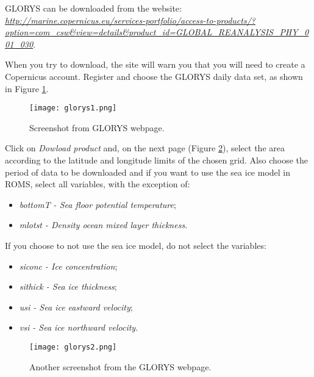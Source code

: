\noindent GLORYS can be downloaded from the website: 
\textcolor{bleu_cite}{\href{http://marine.copernicus.eu/services-portfolio/access-to-products/?option=com\_csw\&view=details\&product\_id=GLOBAL\_REANALYSIS\_PHY\_001\_030}{\textit{http://marine.copernicus.eu/services-portfolio/access-to-products/?option=com\_csw\&view=details\&product\_id=GLOBAL\_REANALYSIS\_PHY\_001\_030}}}.
\bigskip

\noindent When you try to download, the site will warn you that you will need to create a Copernicus account.
Register and choose the GLORYS daily data set, as shown in Figure \textcolor{bleu_cite}{\ref{glorys1}}.
\bigskip

\begin{figure}[H]
    \centering
    \texttt{[image: glorys1.png]}
    \caption{Screenshot from GLORYS webpage.}
    \label{glorys1}
\end{figure}
\bigskip

\noindent Click on \textit{Dowload product} and, on the next page (Figure \textcolor{bleu_cite}{\ref{glorys2}}), select the area according to 
the latitude and longitude limits of the chosen grid. Also choose the period of data to be downloaded and if you want to use the sea 
ice model in ROMS, select all variables, with the exception of:
\bigskip

\begin{itemize}
    \item \textit{ bottomT - Sea floor potential temperature};
    \item \textit{mlotst - Density ocean mixed layer thickness}.
\end{itemize}
\bigskip

\noindent If you choose to not use the sea ice model, do not select the variables:
\bigskip

\begin{itemize}
    \item \textit{siconc - Ice concentration};
    \item \textit{sithick - Sea ice thickness};
    \item \textit{usi - Sea ice eastward velocity};
    \item \textit{vsi - Sea ice northward velocity}.
\end{itemize}
\bigskip

\begin{figure}[H]
    \centering
    \texttt{[image: glorys2.png]}
    \caption{Another screenshot from the GLORYS webpage.}
    \label{glorys2}
\end{figure}
\bigskip

